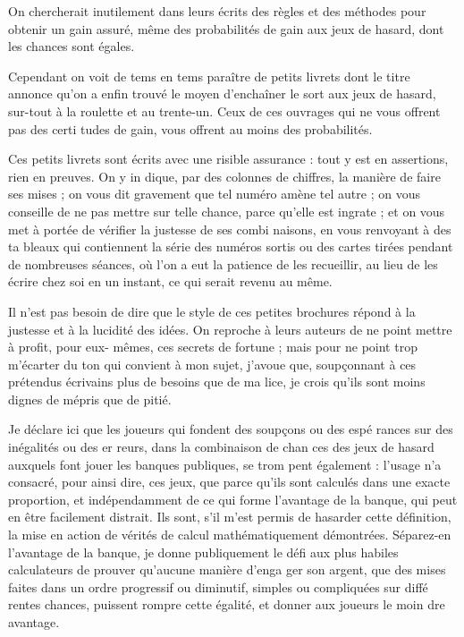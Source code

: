 On chercherait inutilement dans
leurs écrits des règles et des méthodes
pour obtenir un gain assuré, même
des probabilités de gain aux jeux de 
hasard, dont les chances sont égales.

Cependant on voit de tems en tems
paraître de petits livrets dont le titre
annonce qu'on a enfin trouvé le
moyen d'enchaîner le sort aux jeux
de hasard, sur-tout à la roulette et
au trente-un. Ceux de ces ouvrages
qui ne vous offrent pas des certi%
tudes de gain, vous offrent au moins
des probabilités.

Ces petits livrets sont écrits avec
une risible assurance : tout y est en
assertions, rien en preuves. On y in%
dique, par des colonnes de chiffres,
la manière de faire ses mises ; on vous
dit gravement que tel numéro amène
tel autre ; on vous conseille de ne pas
mettre sur telle chance, parce qu'elle
est ingrate ; et on vous met à portée
de vérifier la justesse de ses combi%
naisons, en vous renvoyant à des ta%
bleaux qui contiennent la série des
numéros sortis ou des cartes tirées
pendant de nombreuses séances, où
l'on a eut la patience de les recueillir,
au lieu de les écrire chez soi en un
instant, ce qui serait revenu au même.

Il n'est pas besoin de dire que le
style de ces petites brochures répond
à la justesse et à la lucidité des idées.
On reproche à leurs auteurs de ne
point mettre à profit, pour eux-%
mêmes, ces secrets de fortune ; mais
pour ne point trop m'écarter du ton
qui convient à mon sujet, j'avoue
que, soupçonnant à ces prétendus
écrivains plus de besoins que de ma%
lice, je crois qu'ils sont moins dignes
de mépris que de pitié.

Je déclare ici que les joueurs qui
fondent des soupçons ou des espé%
rances sur des inégalités ou des er%
reurs, dans la combinaison de chan%
ces des jeux de hasard auxquels font
jouer les banques publiques, se trom%
pent également : l'usage n'a consacré,
pour ainsi dire, ces jeux, que parce
qu'ils sont calculés dans une exacte
proportion, et indépendamment de
ce qui forme l'avantage de la banque,
qui peut en être facilement distrait.
Ils sont, s'il m'est permis de hasarder
cette définition, la mise en action de
vérités de calcul mathématiquement
démontrées. Séparez-en l'avantage de
la banque, je donne publiquement le
défi aux plus habiles calculateurs de
prouver qu'aucune manière d'enga%
ger son argent, que des mises faites
dans un ordre progressif ou diminutif,
simples ou compliquées sur diffé%
rentes chances, puissent rompre cette
égalité, et donner aux joueurs le moin%
dre avantage.

